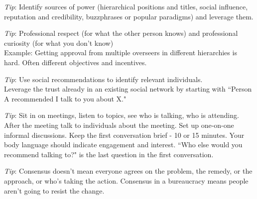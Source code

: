 \textit{Tip}: Identify sources of power (hierarchical positions and titles, social influence, reputation and credibility, buzzphrases or popular paradigms) and leverage them.

\textit{Tip}: Professional respect (for what the other person knows) and professional curiosity (for what you don't know) \\
Example: Getting approval from multiple overseers in different hierarchies is hard. Often different objectives and incentives.

\textit{Tip}: Use social recommendations to identify relevant individuals.\\
Leverage the trust already in an existing social network by starting with ``Person A recommended I talk to you about X."

\textit{Tip}: Sit in on meetings, listen to topics, see who is talking, who is attending. After the meeting talk to individuals about the meeting. Set up one-on-one informal discussions. Keep the first conversation  brief - 10 or 15 minutes. Your body language should indicate engagement and interest. ``Who else would you recommend talking to?" is the last question in the first conversation.


\textit{Tip}: Consensus doesn't mean everyone agrees on the problem, the remedy, or the approach, or who's taking the action. Consensus in a bureaucracy means people aren't going to resist the change.